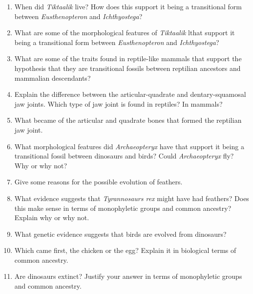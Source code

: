 \documentclass[letterpaper]{tufte-handout}
\begin{document}
\begin{enumerate}
	
	\item When did \textit{Tiktaalik} live? How does this support it being a transitional form between \textit{Eusthenopteron} and \textit{Ichthyostega}?
	
	\item What  are some of the morphological features of \textit{Tiktaalik} lthat support it being a transitional form between \textit{Eusthenopteron} and \textit{Ichthyostega}?
	
	\item What are some of the traits found in reptile-like mammals that support the hypothesis that they are transitional fossils between reptilian ancestors and mammalian descendants?
	
	\item Explain the difference between the articular-quadrate and dentary-squamosal jaw joints. Which type of jaw joint is found in reptiles? In mammals?
	
	\item What became of the articular and quadrate bones that formed the reptilian jaw joint.
	
	\item What morphological features did \textit{Archaeopteryx} have that support it being a transitional fossil between dinosaurs and birds? Could \textit{Archaeopteryx} fly? Why or why not? 
	
	\item Give some reasons for the possible evolution of feathers. 
	
	\item What evidence suggests that \textit{Tyrannosaurs rex} might have had feathers? Does this make sense in terms of monophyletic groups and common ancestry? Explain why or why not.
	
	\item What genetic evidence suggests that birds are evolved from dinosaurs?
	
	\item Which came first, the chicken or the egg? Explain it in biological terms of common ancestry.
	
	\item Are dinosaurs extinct? Justify your answer in terms of monophyletic groups and common ancestry.
	
\end{enumerate}
\end{document}
